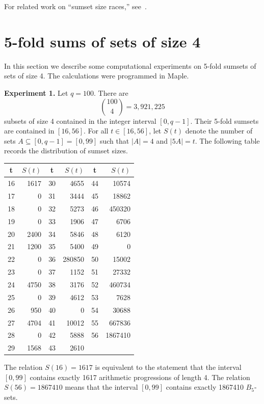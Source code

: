 \documentclass{amsart}
\begin{document}
For related work on ``sumset size races,'' 
see~\cite{fox-krav-zhan25,krav25,peri-roto25}. 





\section{5-fold sums of sets of size 4}
In this section we describe some computational experiments on 
5-fold sumsets of sets of size 4.  The calculations were programmed in Maple. 

\textbf{Experiment 1.} 
Let $q = 100$. 
There are 
\[
\binom{100}{4} = 3,921,225
\]
subsets of size 4 contained in the integer interval $[0,q-1]$.  
Their 5-fold sumsets are contained in $[16,56]$.  
For all $t \in [16,56]$, let $S(t)$ denote the number of sets 
$A \subseteq [0,q-1] = [0,99]$ such that  $|A| = 4$ and $|5A| = t$.  
The following table records the 
distribution of  sumset sizes.

\begin{center}
\begin{tabular}{cr|cr|cr} 
t & $S(t)$  & t & $S(t)$   & t& $S(t)$   \\ \hline
16& 1617 & 30&  4655 & 44 & 10574   \\
 17 & 0 & 31 & 3444& 45 & 18862 \\
 18 & 0 & 32 & 5273 & 46 & 450320 \\
 19 & 0 & 33 & 1906 &  47 &6706 \\
 20 & 2400  &  34& 5846 & 48& 6120  \\                      
21 & 1200  & 35 & 5400  &   49 &  0 \\
22 &0  & 36  & 280850  & 50 & 15002\\
23 & 0 & 37 & 1152  &  51 & 27332 \\
24& 4750  & 38& 3176  & 52 &  460734  \\
25 &  0 & 39  & 4612  &  53 & 7628 \\
26 &950 & 40  &  0 &  54 & 30688 \\
27 &4704 & 41  & 10012  &  55 & 667836 \\
28 & 0 & 42  & 5888  &  56 & 1867410 \\
29&  1568 &  43 &  2610 & &      \\
\end{tabular}
\end{center}
The relation $S(16) = 1617$ is equivalent to the statement that the interval 
$[0,99]$ contains exactly 1617  arithmetic progressions of length 4. 
The relation $S(56) = 1867410$ means that the interval 
$[0,99]$ contains exactly 1867410 $B_5$-sets.  
\end{document}
